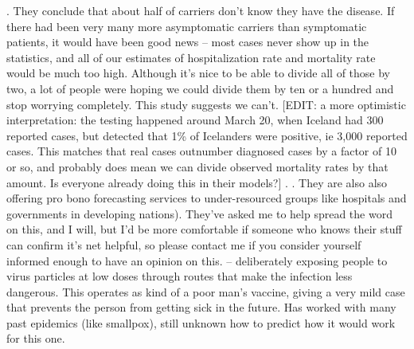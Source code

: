 \begin{xmlentries}
\begin{xmlentriescontent}
{. They conclude that about half of carriers don’t know they have the disease. If there had been very many more asymptomatic carriers than symptomatic patients, it would have been good news – most cases never show up in the statistics, and all of our estimates of hospitalization rate and mortality rate would be much too high. Although it’s nice to be able to divide all of those by two, a lot of people were hoping we could divide them by ten or a hundred and stop worrying completely. This study suggests we can’t. [EDIT:  a more optimistic interpretation: the testing happened around March 20, when Iceland had 300 reported cases, but detected that 1\% of Icelanders were positive, ie 3,000 reported cases. This matches  that real cases outnumber diagnosed cases by a factor of 10 or so, and probably does mean we can divide observed mortality rates by that amount. Is everyone already doing this in their models?]
.
. They are also also offering pro bono forecasting services to under-resourced groups like hospitals and governments in developing nations). They’ve asked me to help spread the word on this, and I will, but I’d be more comfortable if someone who knows their stuff can confirm it’s net helpful, so please contact me if you consider yourself informed enough to have an opinion on this.
 – deliberately exposing people to virus particles at low doses through routes that make the infection less dangerous. This operates as kind of a poor man’s vaccine, giving a very mild case that prevents the person from getting sick in the future. Has worked with many past epidemics (like smallpox), still unknown how to predict how it would work for this one.
}
\end{xmlentriescontent}
\end{xmlentries}
